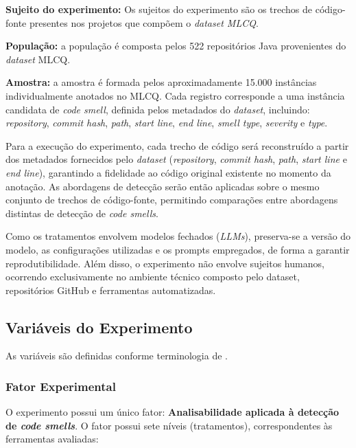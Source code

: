\textbf{Sujeito do experimento:} Os sujeitos do experimento são os trechos de código-fonte presentes nos projetos que compõem o \textit{dataset MLCQ}.

\textbf{População:} a população é composta pelos 522 repositórios Java provenientes do
\textit{dataset} MLCQ.

\textbf{Amostra:} a amostra é formada pelos aproximadamente 15.000 instâncias individualmente anotados
no MLCQ. Cada registro corresponde a uma instância candidata de \textit{code smell}, definida pelos
metadados do \textit{dataset}, incluindo: \textit{repository}, \textit{commit hash}, \textit{path}, \textit{start line},
\textit{end line}, \textit{smell type}, \textit{severity} e \textit{type}.


Para a execução do experimento, cada trecho de código será reconstruído a partir dos metadados fornecidos pelo \textit{dataset}
(\textit{repository}, \textit{commit hash}, \textit{path}, \textit{start line} e \textit{end line}),
garantindo a fidelidade ao código original existente no momento da anotação. As abordagens de detecção serão então aplicadas sobre o mesmo conjunto de trechos de código-fonte,
permitindo comparações entre abordagens distintas de detecção de \textit{code smells}.

Como os tratamentos envolvem modelos fechados (\textit{LLMs}), preserva-se a versão do modelo,
as configurações utilizadas e os prompts empregados, de forma a garantir reprodutibilidade.
Além disso, o experimento não envolve sujeitos humanos, ocorrendo exclusivamente no
ambiente técnico composto pelo dataset, repositórios GitHub e ferramentas automatizadas.

\subsection{Variáveis do Experimento}

As variáveis são definidas conforme terminologia de .

\subsubsection*{Fator Experimental}
O experimento possui um único fator: \textbf{Analisabilidade aplicada à detecção de \textit{code smells}}.
O fator possui sete níveis (tratamentos), correspondentes às ferramentas avaliadas:

